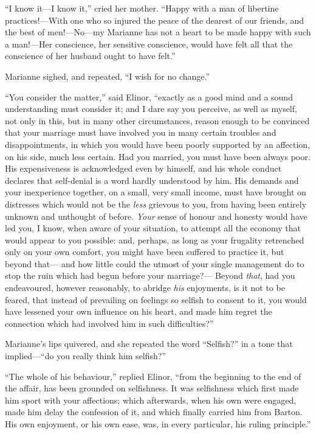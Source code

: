 \documentclass{article}
\begin{document}
``I know it---I know it,'' cried her mother.
``Happy with a man of libertine practices!---With one
who so injured the peace of the dearest of our friends,
and the best of men!---No---my Marianne has not a heart
to be made happy with such a man!---Her conscience, her
sensitive conscience, would have felt all that the
conscience of her husband ought to have felt.''

Marianne sighed, and repeated, ``I wish for no change.''

``You consider the matter,'' said Elinor, ``exactly as
a good mind and a sound understanding must consider it;
and I dare say you perceive, as well as myself, not only
in this, but in many other circumstances, reason enough
to be convinced that your marriage must have involved you
in many certain troubles and disappointments, in which
you would have been poorly supported by an affection,
on his side, much less certain.  Had you married,
you must have been always poor.  His expensiveness is
acknowledged even by himself, and his whole conduct declares
that self-denial is a word hardly understood by him.
His demands and your inexperience together, on a small,
very small income, must have brought on distresses which
would not be the \emph{less} grievous to you, from having been
entirely unknown and unthought of before.  \emph{Your} sense
of honour and honesty would have led you, I know,
when aware of your situation, to attempt all the economy
that would appear to you possible: and, perhaps, as long
as your frugality retrenched only on your own comfort,
you might have been suffered to practice it, but beyond that---%
and how little could the utmost of your single management
do to stop the ruin which had begun before your marriage?---%
Beyond \emph{that}, had you endeavoured, however reasonably,
to abridge \emph{his} enjoyments, is it not to be feared, that instead
of prevailing on feelings so selfish to consent to it,
you would have lessened your own influence on his heart,
and made him regret the connection which had involved him
in such difficulties?''

Marianne's lips quivered, and she repeated the word
``Selfish?'' in a tone that implied---``do you really think
him selfish?''

``The whole of his behaviour,'' replied Elinor,
``from the beginning to the end of the affair, has been
grounded on selfishness.  It was selfishness which first
made him sport with your affections; which afterwards,
when his own were engaged, made him delay the confession
of it, and which finally carried him from Barton.
His own enjoyment, or his own ease, was, in every particular,
his ruling principle.''
\end{document}
